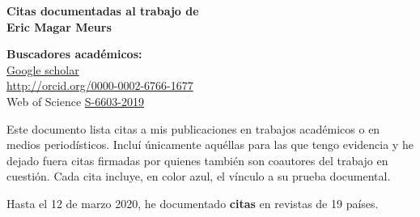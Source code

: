 \documentclass[12 pt, letter]{article}
\begin{document}

\textbf{\LARGE{Citas documentadas al trabajo de \\ Eric Magar Meurs}} \\ [-2ex]
\makebox[\textwidth][r]{\hrulefill}

\begin{footnotesize}
\begin{flushright}
\textbf{Buscadores acad\'emicos:} \\
\href{http://scholar.google.com.mx/citations?user=Rs7pVXQAAAAJ}{Google scholar} \\
\url{http://orcid.org/0000-0002-6766-1677} \\
Web of Science \href{https://publons.com/researcher/1634653/eric-magar/}{S-6603-2019} \\
\end{flushright}
\end{footnotesize}

\bigskip

Este documento lista citas a mis publicaciones en trabajos acad\'emicos o en medios period\'isticos. Inclu\'i \'unicamente aqu\'ellas para las que tengo evidencia y he dejado fuera citas firmadas por quienes tambi\'en son coautores del trabajo en cuesti\'on. Cada cita incluye, en color azul, el v\'inculo a su prueba documental.

\medskip

\noindent Hasta el 12 de marzo 2020, he documentado \textbf{\color{red} 
 citas} en revistas de 19 pa\'ises.
\end{document}
